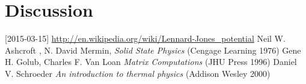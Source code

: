 \documentclass[11pt]{article}
\begin{document}
\section{Discussion}


\begin{thebibliography}{99}
 [2015-03-15] \url{http://en.wikipedia.org/wiki/Lennard-Jones_potential}
 Neil W. Ashcroft , N. David Mermin, \textit{Solid State Physics} (Cengage Learning 1976)
 Gene H. Golub, Charles F. Van Loan \textit{Matrix Computations} (JHU Press 1996)
 Daniel V. Schroeder \textit{An introduction to thermal physics} (Addison Wesley 2000)
\end{thebibliography}
\end{document}

